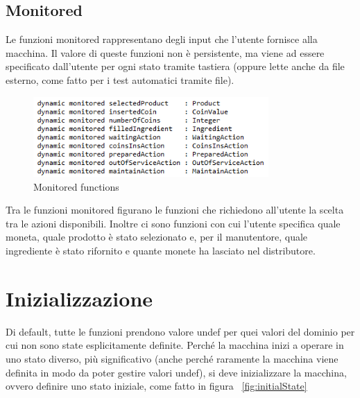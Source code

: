 \subsection{Monitored}
Le funzioni monitored rappresentano degli input che l’utente fornisce alla macchina. Il valore di queste funzioni non è persistente, ma viene ad essere specificato dall’utente per ogni stato tramite tastiera (oppure lette anche da file esterno, come fatto per i test automatici tramite file).
\begin{figure}[h]
	\centering
	\includegraphics[width=0.8\textwidth]{Immagini/MonitoredFunc.png}
	\caption{Monitored functions}
	\label{fig:monitoredFunc}
\end{figure}
Tra le funzioni monitored figurano le funzioni che richiedono all’utente la scelta tra le azioni disponibili. Inoltre ci sono funzioni con cui l’utente specifica quale moneta, quale prodotto è stato selezionato e, per il manutentore, quale ingrediente è stato rifornito e quante monete ha lasciato nel distributore.

\section{Inizializzazione}
Di default, tutte le funzioni prendono valore undef per quei valori del dominio per cui non sono state esplicitamente definite.	
Perché la macchina inizi a operare in uno stato diverso, più significativo (anche perché raramente la macchina viene definita in modo da poter gestire valori undef), si deve inizializzare la macchina, ovvero definire uno stato iniziale, come fatto in figura ~\ref{fig:initialState}

